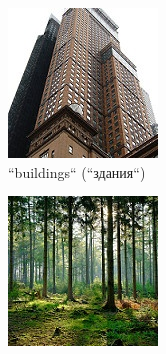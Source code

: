 \begin{figure}[htbp]
  \centering
  \begin{subfigure}[b]{0.3\textwidth}
    \centering
    \includegraphics[width=\textwidth]{images/research/dataset/buildings.jpg}
    \caption{``buildings`` (``здания``)}
    \label{fig:intel-multiclass-buildings}
  \end{subfigure}
  \hfill
  \begin{subfigure}[b]{0.3\textwidth}
    \centering
    \includegraphics[width=\textwidth]{images/research/dataset/forest.jpg}

\end{subfigure}
\end{figure}
